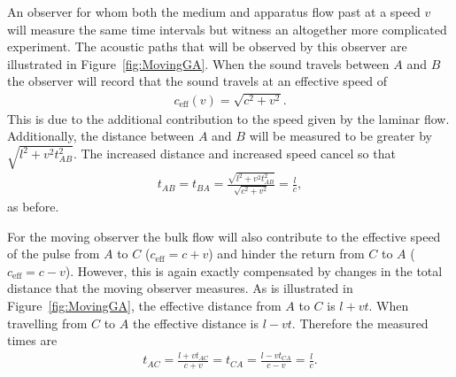 \documentclass[10pt, fleqn,final,showtrims,oldfontcommands]{article} %
\newcommand{\figref}[1]{Figure~\ref{fig:#1}}
\newcommand{\eff}{{\textrm{eff}}}
\begin{document}
An observer for whom  both the medium and apparatus flow past at a speed $v$ will measure the same time intervals 
but witness an altogether more complicated experiment.
The acoustic paths that will be observed by this observer are illustrated in \figref{MovingGA}.
When the sound travels between $A$ and $B$ the observer will record that the sound travels at an effective speed of
\begin{align}
\label{eqn:ceffone}
c_\eff(v) = \sqrt{c^2 +v^2}.
\end{align}
This is due to the additional contribution to the speed given by the  laminar flow.
Additionally, the distance between $A$ and $B$ will be measured to be greater by  $\sqrt{l^2+v^2t_{AB}^2}$.
The increased distance and increased speed cancel so that 
\begin{align}
  \label{eqn:setupA:moving:Tab}
  t_{AB} = t_{BA} = \frac{\sqrt{l^2+v^2t_{AB}^2}}{\sqrt{c^2 +v^2}} = \frac{l}{c},
\end{align}
as before.

For the moving observer the bulk flow will also contribute to the effective speed of the pulse from $A$ to $C$  ($c_\eff = c+v$) 
and hinder  the return from $C$ to $A$ ($c_\eff = c-v$).
However, this is again exactly compensated by changes in the total distance that the moving observer measures.
As is illustrated in \figref{MovingGA}, the effective distance from $A$ to $C$ is $l+vt$. %
When travelling from $C$ to $A$ the effective distance is $l-vt$. %
%
Therefore the measured times are
\begin{align}
  \label{eqn:setupA:moving:Tac}
  t_{AC} =  \frac{l+vt_{AC}}{c+v}= t_{CA} =  \frac{l-vt_{CA}}{c-v}= \frac{l}{c}.
\end{align}
\end{document}

